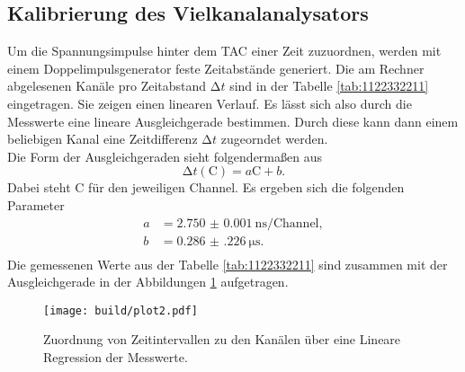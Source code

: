\subsection{Kalibrierung des Vielkanalanalysators}
Um die Spannungsimpulse hinter dem TAC einer Zeit zuzuordnen, werden mit einem Doppelimpulsgenerator feste Zeitabstände generiert. Die am Rechner abgelesenen Kanäle pro Zeitabstand $\increment t$
sind in der Tabelle \ref{tab:1122332211} eingetragen. Sie zeigen einen linearen Verlauf. Es lässt sich also durch die Messwerte eine lineare Ausgleichgerade bestimmen. Durch diese kann dann einem
beliebigen Kanal eine Zeitdifferenz $\increment t$ zugeorndet werden.
\\
Die Form der Ausgleichgeraden sieht folgendermaßen aus
\begin{equation}
\increment t (\text{C}) = a  \text{C} + b.
\end{equation}
Dabei steht $\text{C}$ für den jeweiligen Channel. 
Es ergeben sich die folgenden Parameter
\begin{align*}
    a &= \SI{2.750(1)}{\nano\second\per{\text{Channel}}},\\
    b &= \SI{0.286(226)}{\micro\second}.\\
\end{align*}
Die gemessenen Werte aus der Tabelle \ref{tab:1122332211} sind zusammen mit der Ausgleichgerade in der Abbildungen \ref{fig:333} aufgetragen.
\begin{figure}
    \centering
    \texttt{[image: build/plot2.pdf]}
    \caption{Zuordnung von Zeitintervallen zu den Kanälen über eine Lineare Regression der Messwerte.} 
    \label{fig:333}
\end{figure}